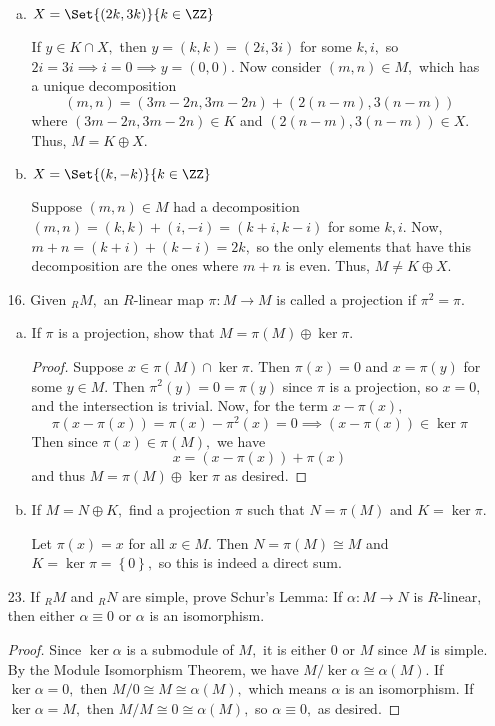 \documentclass{article}
\begin{document}
\begin{itemize}
\begin{enumerate}[(a)]
			\item $X=\Set{(2k, 3k)}{k\in\ZZ}$
				\begin{soln}
					If $y\in K\cap X,$ then $y=(k, k)=(2i, 3i)$ for some $k, i,$ so $2i=3i\implies i=0\implies y=(0, 0).$ Now consider $(m, n)\in M,$ which has a unique decomposition
					\[(m, n) = (3m-2n, 3m-2n)+(2(n-m), 3(n-m))\]
					where $(3m-2n, 3m-2n)\in K$ and $(2(n-m), 3(n-m))\in X.$ Thus, $M=K\oplus X.$
				\end{soln}

			\item $X=\Set{(k, -k)}{k\in\ZZ}$
				\begin{soln}
					Suppose $(m, n)\in M$ had a decomposition $(m, n) = (k, k) + (i, -i) = (k+i, k-i)$ for some $k, i.$ Now, $m+n=(k+i)+(k-i)=2k,$ so the only elements that have this decomposition are the ones where $m+n$ is even. Thus, $M\neq K\oplus X.$
				\end{soln}

		\end{enumerate}

	\item[16.] Given $_R M,$ an $R$-linear map $\pi:M\to M$ is called a projection if $\pi^2=\pi.$
		\begin{enumerate}[(a)]
			\item If $\pi$ is a projection, show that $M=\pi(M)\oplus \ker \pi.$
				\begin{proof}
					Suppose $x\in \pi(M)\cap \ker\pi.$ Then $\pi(x)=0$ and $x=\pi(y)$ for some $y\in M.$ Then $\pi^2(y)=0=\pi(y)$ since $\pi$ is a projection, so $x=0,$ and the intersection is trivial. Now, for the term $x-\pi(x),$
					\[\pi(x-\pi(x))=\pi(x)-\pi^2(x)=0\implies (x-\pi(x))\in\ker\pi\]
					Then since $\pi(x)\in \pi(M),$ we have
					\[x=(x-\pi(x))+\pi(x)\]
					and thus $M=\pi(M)\oplus \ker\pi$ as desired.
				\end{proof}

			\item If $M=N\oplus K,$ find a projection $\pi$ such that $N=\pi(M)$ and $K=\ker \pi.$
				\begin{soln}
					Let $\pi(x)=x$ for all $x\in M.$ Then $N=\pi(M)\cong M$ and $K=\ker\pi=\left\{ 0 \right\},$ so this is indeed a direct sum.
				\end{soln}

		\end{enumerate}

		\newpage
	\item[23.] If $_R M$ and $_R N$ are simple, prove Schur's Lemma: If $\alpha:M\to N$ is $R$-linear, then either $\alpha\equiv0$ or $\alpha$ is an isomorphism.
		\begin{proof}
			Since $\ker\alpha$ is a submodule of $M,$ it is either $0$ or $M$ since $M$ is simple. By the Module Isomorphism Theorem, we have $M/\ker\alpha\cong \alpha(M).$ If $\ker\alpha=0,$ then $M/0\cong M\cong \alpha(M),$ which means $\alpha$ is an isomorphism. If $\ker\alpha=M,$ then $M/M\cong 0\cong \alpha(M),$ so $\alpha\equiv0,$ as desired.	
		\end{proof}


\end{itemize}
\end{document}

